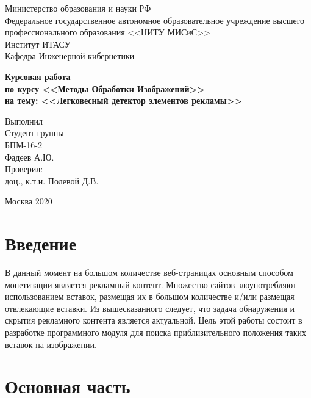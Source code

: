 \documentclass[a4paper,12pt,preview]{report} %
\begin{document}
	
	\begin{center}
		Министерство образования и науки РФ \\
		Федеральное государственное автономное образовательное учреждение высшего профессионального образования <<НИТУ МИСиС>>\\
		Институт ИТАСУ\\
		Кафедра Инженерной кибернетики\\
	\end{center}
	
	
	\vfill
	
	\begin{center}
		\Large\textbf{Курсовая работа \\
			по курсу <<Методы Обработки Изображений>> \\
			на тему: <<Легковесный детектор элементов рекламы>>}
	\end{center}
	
	\vfill
	
	\begin{FlushRight}
		Выполнил\\
		Студент группы \\
		БПМ-16-2 \\
		Фадеев А.Ю. \\
		[\baselineskip]
		Проверил: \\
		доц., к.т.н. Полевой Д.В. \\
		[9\baselineskip]
	\end{FlushRight}
	
	
	\begin{center}
		Москва 2020
	\end{center}
	
	\thispagestyle{empty}
	\newpage
	
	\tableofcontents
	\newpage
	
	
	\chapter{Введение}
	
	В данный момент на большом количестве веб-страницах основным способом монетизации является рекламный контент. Множество сайтов злоупотребляют использованием вставок,
	размещая их в большом количестве и/или размещая отвлекающие вставки. Из вышесказанного следует, что задача обнаружения и скрытия рекламного контента является актуальной.
	Цель этой работы состоит в разработке программного модуля для поиска приблизительного положения таких вставок на изображении.
	
	\chapter{Основная часть}
	
\end{document}
